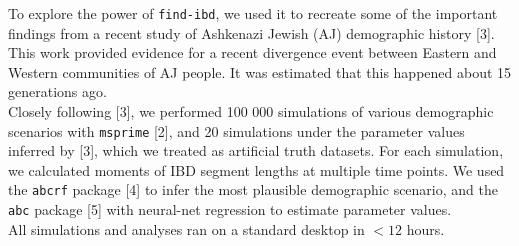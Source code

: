 \documentclass[25pt, a0paper, portrait, margin=0mm, innermargin=15mm,
     blockverticalspace=15mm, colspace=15mm, subcolspace=8mm]{tikzposter} %
\begin{document}
\begin{columns}
{{\fontsize{34}{35}\selectfont To explore the power of \texttt{find-ibd}, we used it to recreate some of the important findings from a recent study of Ashkenazi Jewish (AJ) demographic history [3]. This work provided evidence for a recent divergence event between Eastern and Western communities of AJ people. It was estimated that this happened about 15 generations ago.\\[2mm]
Closely following [3], we performed 100 000 simulations of various demographic scenarios with \texttt{msprime} [2], and 20 simulations under the parameter values inferred by [3], which we treated as artificial truth datasets. For each simulation, we calculated moments of IBD segment lengths at multiple time points. We used the \texttt{abcrf} package [4] to infer the most plausible demographic scenario, and the \texttt{abc} package [5] with neural-net regression to estimate parameter values.\\
All simulations and analyses ran on a standard desktop in $<12$ hours.
}
}
     \end{columns}
\end{document}
